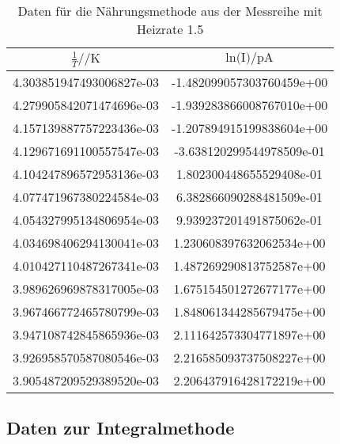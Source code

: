 \begin{table}
 \centering
 \begin{tabular}{S[round-mode = places , round-precision = 4,scientific-notation=fixed, fixed-exponent = 0] S[round-mode = places , round-precision = 2,scientific-notation=fixed, fixed-exponent = 0]}
   \toprule
    $\frac{1}{T} / \si{\per\kelvin}$ &  $ \text{ln(I)} / \si{\pico\ampere} $\\
   \midrule
	4.303851947493006827e-03 & -1.482099057303760459e+00\\
	4.279905842071474696e-03 & -1.939283866008767010e+00\\
	4.157139887757223436e-03 & -1.207894915199838604e+00\\
	4.129671691100557547e-03 & -3.638120299544978509e-01\\
	4.104247896572953136e-03 & 1.802300448655529408e-01\\
	4.077471967380224584e-03 & 6.382866090288481509e-01\\
	4.054327995134806954e-03 & 9.939237201491875062e-01\\
	4.034698406294130041e-03 & 1.230608397632062534e+00\\
	4.010427110487267341e-03 & 1.487269290813752587e+00\\
	3.989626969878317005e-03 & 1.675154501272677177e+00\\
	3.967466772465780799e-03 & 1.848061344285679475e+00\\
	3.947108742845865936e-03 & 2.111642573304771897e+00\\
	3.926958570587080546e-03 & 2.216585093737508227e+00\\
	3.905487209529389520e-03 & 2.206437916428172219e+00\\
   \bottomrule
 \end{tabular}
 \caption{Daten für die Nährungsmethode aus der Messreihe mit Heizrate 1.5}
 \label{tab:WM115tab}
\end{table}
\FloatBarrier
\subsection{Daten zur Integralmethode}

